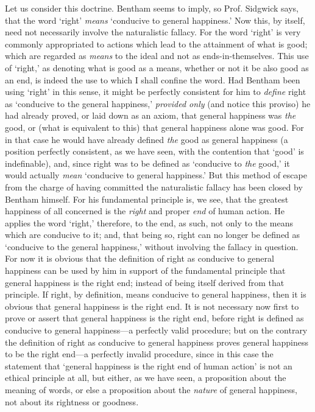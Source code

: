 Let us consider this doctrine. Bentham seems to imply, so Prof.
Sidgwick says, that the word `right' \textit{means} `conducive to
general happiness.' Now this, by itself, need not necessarily involve
the naturalistic fallacy. For the word `right' is very commonly
appropriated to actions which lead to the attainment of what is good;
which are regarded as \textit{means} to the ideal and not as
ends-in-themselves. This use of `right,' as denoting what is good as a
means, whether or not it be also good as an end, is indeed the use to
which I shall confine the word. Had Bentham been using `right' in this
sense, it might be perfectly consistent for him to \textit{define}
right as `conducive to the general happiness,' \textit{provided only}
(and notice this proviso) he had already proved, or laid down as an
axiom, that general happiness was \textit{the} good, or (what is
equivalent to this) that general happiness alone was good. For in that
case he would have already defined \textit{the} good as general
happiness (a position perfectly consistent, as we have seen, with the
contention that `good' is indefinable), and, since right was to be
defined as `conducive to \textit{the} good,' it would actually
\textit{mean} `conducive to general happiness.' But this method of
escape from the charge of having committed the naturalistic fallacy
has been closed by Bentham himself. For his fundamental principle is,
we see, that the greatest happiness of all concerned is the
\textit{right} and proper \textit{end} of human action. He applies the
word `right,' therefore, to the end, as such, not only to the means
which are  conducive to it; and, that being so, right can no
longer be defined as `conducive to the general happiness,' without
involving the fallacy in question. For now it is obvious that the
definition of right as conducive to general happiness can be used by
him in support of the fundamental principle that general happiness is
the right end; instead of being itself derived from that principle. If
right, by definition, means conducive to general happiness, then it is
obvious that general happiness is the right end. It is not necessary
now first to prove or assert that general happiness is the right end,
before right is defined as conducive to general happiness---a
perfectly valid procedure; but on the contrary the definition of right
as conducive to general happiness proves general happiness to be the
right end---a perfectly invalid procedure, since in this case the
statement that `general happiness is the right end of human action' is
not an ethical principle at all, but either, as we have seen, a
proposition about the meaning of words, or else a proposition about
the \textit{nature} of general happiness, not about its rightness or
goodness.

